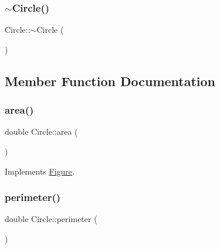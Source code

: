 \mbox{\label{class_circle_ae3f30436e645d73e368e8ee55f8d1650}} 
\subsubsection{\texorpdfstring{$\sim$\+Circle()}{~Circle()}}
{\footnotesize\ttfamily Circle\+::$\sim$\+Circle (\begin{DoxyParamCaption}{ }\end{DoxyParamCaption})\hspace{0.3cm}{\ttfamily [inline]}}



\subsection{Member Function Documentation}
\mbox{\label{class_circle_a4f31d14f360b6e1f1acfb283ad65145a}} 
\subsubsection{\texorpdfstring{area()}{area()}}
{\footnotesize\ttfamily double Circle\+::area (\begin{DoxyParamCaption}{ }\end{DoxyParamCaption})\hspace{0.3cm}{\ttfamily [virtual]}}



Implements \hyperlink{class_figure_a9860bda67fc9ce8127a812e167c4ce75}{Figure}.

\mbox{\label{class_circle_ab0a4db4a814591918b0372feac5df46b}} 
\subsubsection{\texorpdfstring{perimeter()}{perimeter()}}
{\footnotesize\ttfamily double Circle\+::perimeter (\begin{DoxyParamCaption}{ }\end{DoxyParamCaption})\hspace{0.3cm}{\ttfamily [virtual]}}



